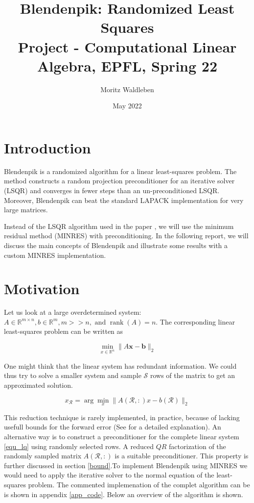 \documentclass{article}
\title{Blendenpik: Randomized Least Squares \\[1ex] \large Project - Computational Linear Algebra, EPFL, Spring 22}
\author{Moritz Waldleben}
\date{May 2022}
\begin{document}
\maketitle

\section{Introduction} \label{intro}
Blendenpik \cite{blendenpik} is a randomized algorithm for a linear
least-squares problem. The method constructs a random projection preconditioner
for an iterative solver (LSQR) and converges in fewer steps than an
un-preconditioned LSQR. Moreover, Blendenpik can beat the standard LAPACK
implementation for very large matrices. 

Instead of the LSQR algorithm used in the paper \cite{blendenpik}, we will use
the minimum residual method (MINRES) with preconditioning. In the following
report, we will discuss the main concepts of Blendenpik and illustrate some
results with a custom MINRES implementation.

\section{Motivation} \label{mot}
Let us look at a large overdetermined system: $A \in \mathbb{R}^{m \times n}, b
\in \mathbb{R}^{m}, m>>n, \text { and } \operatorname{rank}(A)=n$. The
corresponding linear least-squares problem can be written as

\begin{equation} \label{equ_lq}
\min _{x \in \mathbb{R}^{n}}\|A \mathbf{x}-\mathbf{b}\|_{2}
\end{equation}

One might think that the linear system has redundant information. We could thus
try to solve a smaller system and sample $\mathcal{S}$ rows of the matrix to
get an approximated solution.

\begin{equation} \label{equ_lq_red}
x_{\mathcal{R}}=\arg \min _{x}\|A(\mathcal{R},:) x-b(\mathcal{R})\|_{2}
\end{equation}

This reduction technique is rarely implemented, in practice, because of lacking
usefull bounds for the forward error (See \cite{blendenpik} for a detailed
explanation). An alternative way is to construct a preconditioner for the
complete linear system \ref{equ_lq} using randomly selected rows. A reduced
$QR$ factorization of the randomly sampled matrix $A(\mathcal{R},:)$ is a
suitable preconditioner. This property is further discussed in section
\ref{bound}.To implement Blendenpik using MINRES we would need to apply the
iterative solver to the normal equation of the least-squares problem. The
commented implemenation of the complet algorithm can be is shown in appendix
\ref{app_code}. Below an overview of the algorithm is shown.
\end{document}
